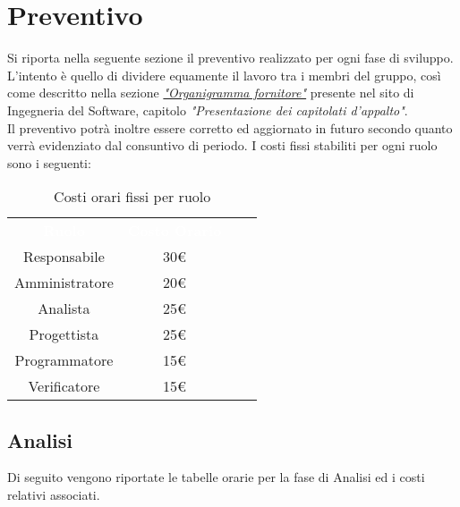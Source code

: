 \section{Preventivo}
Si riporta nella seguente sezione il preventivo realizzato per ogni fase
di sviluppo.\\
L'intento è quello di dividere equamente il lavoro tra i membri del gruppo,
così come descritto nella sezione \href{https://www.math.unipd.it/~tullio/IS-1/2021/Progetto/Capitolati.html}{\textit{"Organigramma fornitore"}}
presente nel sito di Ingegneria del Software, capitolo \textit{"Presentazione dei capitolati d'appalto"}.\\
Il preventivo potrà inoltre essere corretto ed aggiornato in futuro secondo quanto verrà evidenziato dal consuntivo di periodo.
\bigbreak
\noindent
I costi fissi stabiliti per ogni ruolo sono i seguenti:
\begin{table}[htb]
    \centering
    {\renewcommand{\arraystretch}{1.5}
    \begin{tabular}{cccc}
	    \rowcolor[RGB]{33, 73, 50}
	    \textcolor{white}{\textbf{Ruolo}} & \textcolor{white}{\textbf{Costo Orario}}\\
	    \rowcolor[RGB]{216, 235, 171}
	    Responsabile & 30\euro \\
	    \rowcolor[RGB]{233, 245, 206}
	    Amministratore & 20\euro\\
        \rowcolor[RGB]{216, 235, 171}
	    Analista & 25\euro\\
	    \rowcolor[RGB]{233, 245, 206}
	    Progettista & 25\euro\\
        \rowcolor[RGB]{216, 235, 171}
	    Programmatore & 15\euro\\
	    \rowcolor[RGB]{233, 245, 206}
	    Verificatore & 15\euro\\
    \end{tabular}	
}
\caption{Costi orari fissi per ruolo}
\end{table}

\subsection{Analisi}
Di seguito vengono riportate le tabelle orarie per la fase di Analisi ed i costi relativi associati.

\setlength\extrarowheight{5pt}

